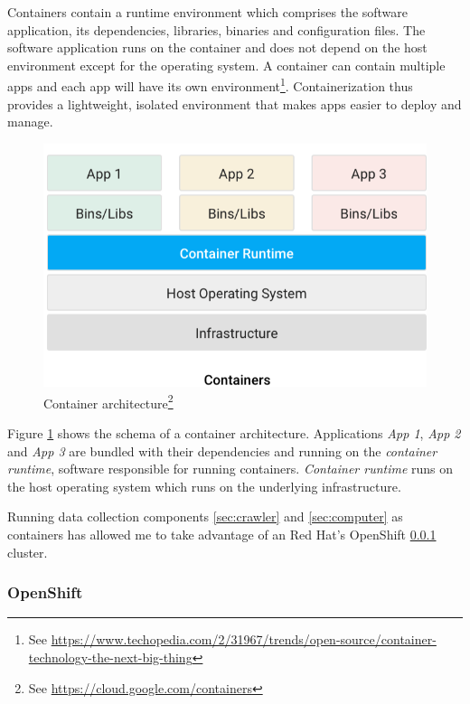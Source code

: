 Containers contain a runtime environment which comprises the software application, its dependencies, libraries, binaries and configuration files.
The software application runs on the container and does not depend on the host environment except for the operating system.
A container can contain multiple apps and each app will have its own environment\footnote{See \url{https://www.techopedia.com/2/31967/trends/open-source/container-technology-the-next-big-thing}}.
Containerization thus provides a lightweight, isolated environment that makes apps easier to deploy and manage.

\begin{figure}
    \centering
    \includegraphics[scale=0.5]{chapters/chapter3/containerization.png}
    \caption{Container architecture\footnote{See \url{https://cloud.google.com/containers}}}
    \label{fig:container}
\end{figure}

Figure \ref{fig:container} shows the schema of a container architecture.
Applications \emph{App 1}, \emph{App 2} and \emph{App 3} are bundled with their dependencies and running on the \emph{container runtime}, software responsible for running containers.
\emph{Container runtime} runs on the host operating system which runs on the underlying infrastructure.

Running data collection components \ref{sec:crawler} and \ref{sec:computer} as containers has allowed me to take advantage of an Red Hat's OpenShift \ref{sec:openshift} cluster.

\subsubsection{OpenShift}
\label{sec:openshift}

